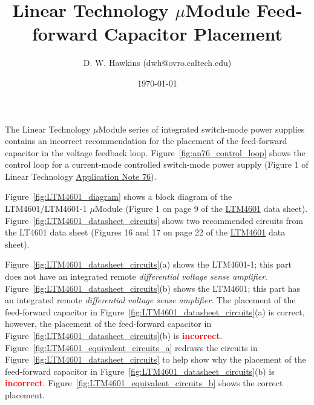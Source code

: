 \documentclass[10pt,twoside]{article}
\begin{document}
\title{Linear Technology $\mu$Module Feed-forward Capacitor Placement}
\author{D. W. Hawkins (dwh@ovro.caltech.edu)}
\date{\today}
\maketitle

\thispagestyle{empty}



\pagestyle{fancy}
\chead{}
\rhead{\today}
\lfoot{}
\cfoot{}
\rfoot{\thepage}
\renewcommand{\headrulewidth}{0.4pt}
\renewcommand{\footrulewidth}{0.4pt}

\lstset{language=Tcl}


The Linear Technology $\mu$Module series of integrated switch-mode
power supplies contains an incorrect recommendation for the
placement of the feed-forward capacitor in the voltage feedback
loop. Figure~\ref{fig:an76_control_loop} shows the control
loop for a current-mode controlled switch-mode power supply
(Figure 1 of Linear Technology
\href{http://cds.linear.com/docs/Application%20Note/an76.pdf}
{Application Note 76}).

Figure~\ref{fig:LTM4601_diagram} shows a block diagram of the
LTM4601/LTM4601-1 $\mu$Module (Figure 1 on page 9 of the
\href{http://cds.linear.com/docs/Datasheet/4601fc.pdf}
{LTM4601} data sheet).
Figure~\ref{fig:LTM4601_datasheet_circuits} shows two recommended
circuits from the LT4601 data sheet
(Figures 16 and 17 on page 22 of the
\href{http://cds.linear.com/docs/Datasheet/4601fc.pdf}
{LTM4601} data sheet).

Figure~\ref{fig:LTM4601_datasheet_circuits}(a) shows the
LTM4601-1; this part does not have an integrated
remote {\em differential voltage sense amplifier}.
Figure~\ref{fig:LTM4601_datasheet_circuits}(b) shows the
LTM4601; this part has an integrated remote
{\em differential voltage sense amplifier}.
The placement of the feed-forward capacitor in 
Figure~\ref{fig:LTM4601_datasheet_circuits}(a) is correct,
however, the placement of the feed-forward capacitor in 
Figure~\ref{fig:LTM4601_datasheet_circuits}(b) is
\textcolor{red}{\bf incorrect}. 
%
Figure~\ref{fig:LTM4601_equivalent_circuits_a} redraws the
circuits in Figure~\ref{fig:LTM4601_datasheet_circuits}
to help show why the placement of the feed-forward
capacitor in Figure~\ref{fig:LTM4601_datasheet_circuits}(b) is
\textcolor{red}{\bf incorrect}. 
Figure~\ref{fig:LTM4601_equivalent_circuits_b}
shows the correct placement.
\end{document}
